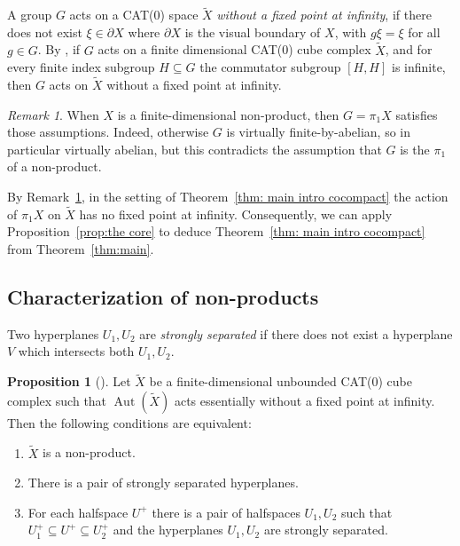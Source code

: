 \documentclass[12pt,oneside]{amsart}
\theoremstyle{definition}
\newtheorem{prop}[thm]{Proposition}
\theoremstyle{definition}
\theoremstyle{remark}
\newtheorem{remark}[thm]{Remark}
\DeclareMathOperator{\Aut}{Aut}
\begin{document}
 A group $G$ acts on a CAT(0) space $\widetilde X$ \emph{without a fixed point at infinity}, if there does not exist $\xi \in \partial X$ where $\partial X$ is the visual boundary of $X$, with $g\xi =\xi$ for all $g\in G$.
By \cite[Thm~1.9 and Clm~4.9]{Genevois25}, if $G$ acts on a finite dimensional CAT(0) cube complex $\widetilde X$, and for every finite index subgroup $H\subseteq G$ the commutator subgroup $[H,H]$ is infinite, then $G$ acts on $\widetilde X$ without a fixed point at infinity.

\begin{remark}\label{rmk: no fixed point}
    When $X$ is a finite-dimensional non-product, then $G=\pi_1X$ satisfies those assumptions. Indeed, otherwise $G$ is virtually finite-by-abelian, so in particular virtually abelian, but this contradicts the assumption that $G$ is the $\pi_1$ of a non-product.
\end{remark}

By Remark~\ref{rmk: no fixed point}, in the setting of Theorem~\ref{thm: main intro cocompact} the action of $\pi_1X$ on $\widetilde X$ has no fixed point at infinity. Consequently, we can apply Proposition~\ref{prop:the core} to deduce Theorem~\ref{thm: main intro cocompact} from Theorem~\ref{thm:main}.


\subsection{Characterization of non-products}

Two hyperplanes $U_1, U_2$ are \emph{strongly separated} if there does not exist a hyperplane $V$ which intersects both $U_1, U_2$.

\begin{prop}[{\cite[Prop~5.1]{CapraceSageev2011}}]\label{prop: non-product characterization}
    Let $\widetilde X$ be a finite-dimensional unbounded CAT(0) cube complex such that $\Aut(\widetilde X)$ acts essentially without a fixed point at infinity. Then the following conditions are equivalent:
    \begin{enumerate}
        \item $\widetilde X$ is a non-product.
        \item There is a pair of strongly separated hyperplanes.
        \item For each halfspace $U^+$ there is a pair of halfspaces $U_1,U_2$ such that $U_1^+\subseteq U^+\subseteq U_2^+$ and the hyperplanes $U_1, U_2$ are strongly separated.
    \end{enumerate}
\end{prop}
\end{document}
